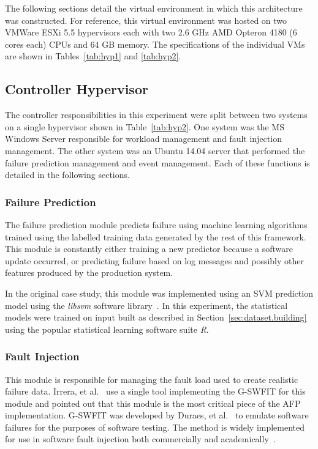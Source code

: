 \figannotatedAFP  

The following sections detail the virtual environment in which this
architecture was constructed.  For reference, this virtual environment was
hosted on two VMWare ESXi 5.5 hypervisors each with two 2.6 \ac{GHz} AMD
Opteron 4180 (6 cores each) \ac{CPU}s and 64 \ac{GB} memory.  The
specifications of the individual \ac{VM}s are shown in Tables~\ref{tab:hyp1}
and \ref{tab:hyp2}.

\tabHypervisorOne
\tabHypervisorTwo

\setcounter{secnumdepth}{5}

\subsection{Controller Hypervisor} \label{sec:controller} %
The controller responsibilities in this experiment were split between two
systems on a single hypervisor shown in Table~\ref{tab:hyp2}.  One system was
the \ac{MS} Windows Server responsible for workload management and fault
injection management.  The other system was an Ubuntu 14.04 server that
performed the failure prediction management and event management.  Each of
these functions is detailed in the following sections.

\subsubsection{Failure Prediction} \label{sec:failurePrediction} %
The failure prediction module predicts failure using machine learning
algorithms trained using the labelled training data generated by the rest of
this framework.  This module is constantly either training a new predictor
because a software update occurred, or predicting failure based on log messages
and possibly other features produced by the production system.

In the original case study, this module was implemented using an \ac{SVM}
prediction model using the \emph{libsvm} software library~\cite{irrera2015}.
In this experiment, the statistical models were trained on input built as
described in Section~\ref{sec:dataset.building} using the popular statistical
learning software suite \emph{R}.

\subsubsection{Fault Injection} \label{sec:faultInjectionMgr}
This module is responsible for managing the fault load used to create realistic
failure data.  Irrera, et al.~\cite{irrera2015} use a single tool implementing
the \ac{G-SWFIT} for this module and pointed out that this module is the most
critical piece of the \ac{AFP} implementation.  \ac{G-SWFIT} was developed by
Duraes, et al.~\cite{gswfit} to emulate software failures for the purposes of
software testing.  The method is widely implemented for use in software fault
injection both commercially and
academically~\cite{cotroneo2012,irrera2014,natella2010,umadevi2015}.  

